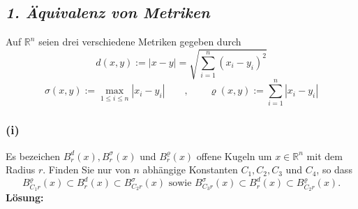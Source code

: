 \subsection*{\itshape 1. Äquivalenz von Metriken}

Auf $\mathbb{R}^n$ seien drei verschiedene Metriken gegeben durch
$$
d(x,y) := |x - y| = \sqrt{\sum^n_{i=1} (x_i - y_i)^2}
$$
$$
\sigma (x,y) := \underset{1\leq i \leq n}{\max} |x_i - y_i| \qquad , \qquad \varrho (x,y) := \sum^n_{i=1} |x_i - y_i|
$$

\subsubsection*{(i)} 
Es bezeichen $B_r^d(x), B_r^\sigma (x)$ und $B_r^\varrho (x)$ offene Kugeln um $x\in\mathbb{R}^n$ mit dem Radius $r$.
Finden Sie nur von $n$ abhängige Konstanten $C_1, C_2, C_3$ und $C_4$, so dass
$$
    B^\varrho_{C_1r}(x) \subset B_r^d (x) \subset B_{C_2r}^\sigma (x) \text{ sowie } B^\sigma_{C_3r}(x) \subset B_r^d (x) \subset B_{C_2r}^\varrho (x). 
$$
\textbf{Lösung:}\\

